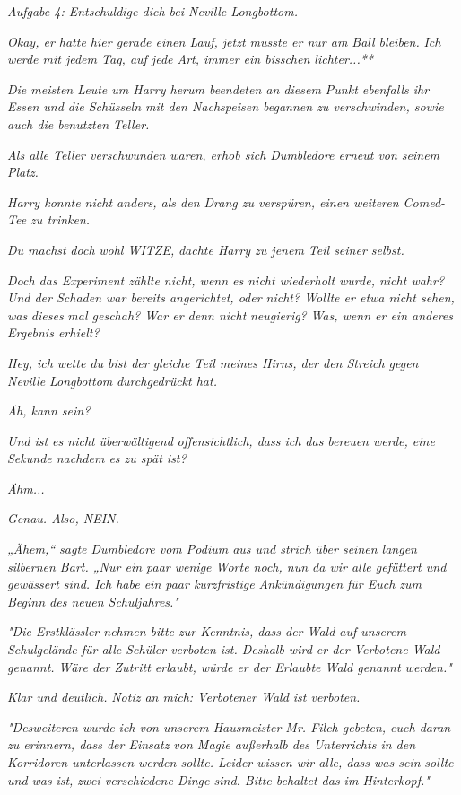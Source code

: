 {\emph{\emph{Aufgabe 4: Entschuldige dich bei Neville Longbottom.}}

\emph{Okay, er hatte hier gerade einen Lauf, jetzt musste er nur am Ball bleiben.} \emph{\emph{Ich werde mit jedem Tag, auf jede Art, immer ein bisschen lichter...}**}

\emph{Die meisten Leute um Harry herum beendeten an diesem Punkt ebenfalls ihr Essen und die Schüsseln mit den Nachspeisen begannen zu verschwinden, sowie auch die benutzten Teller.}

\emph{Als alle Teller verschwunden waren, erhob sich Dumbledore erneut von seinem Platz.}

\emph{Harry konnte nicht anders, als den Drang zu verspüren, einen weiteren Comed-Tee zu trinken.}

\emph{\emph{Du machst}} \emph{\emph{doch}} \emph{\emph{wohl WITZE,}} \emph{dachte Harry zu jenem Teil seiner selbst.}

\emph{Doch das Experiment zählte nicht, wenn es nicht wiederholt wurde, nicht wahr? Und der Schaden war bereits angerichtet, oder nicht? Wollte er etwa nicht sehen, was} \emph{\emph{dieses}} \emph{mal geschah? War er denn nicht} \emph{\emph{neugierig?}} \emph{Was, wenn er ein anderes Ergebnis erhielt?}

\emph{\emph{Hey, ich wette du bist der gleiche Teil meines Hirns, der den Streich gegen Neville}} \emph{\emph{Longbottom}} \emph{\emph{durchgedrückt hat.}}

\emph{Äh, kann sein?}

\emph{\emph{Und ist es nicht}} \emph{überwältigend} \emph{\emph{offensichtlich, dass ich das bereuen werde, eine Sekunde nachdem es zu spät ist?}}

\emph{Ähm...}

\emph{\emph{Genau. Also, NEIN.}}

\emph{„Ähem,“ sagte Dumbledore vom Podium aus und strich über seinen langen silbernen Bart. „Nur ein paar wenige Worte noch, nun da wir alle gefüttert und gewässert sind. Ich habe ein paar kurzfristige Ankündigungen für Euch zum Beginn des neuen Schuljahres."}

\emph{"Die Erstklässler nehmen bitte zur Kenntnis, dass der Wald auf unserem Schulgelände für alle Schüler verboten ist. Deshalb wird er der Verbotene Wald genannt. Wäre der Zutritt erlaubt, würde er der Erlaubte Wald genannt werden."}

\emph{Klar und deutlich.} \emph{\emph{Notiz an mich: Verbotener Wald ist verboten.}}

\emph{"Desweiteren wurde ich von unserem Hausmeister Mr. Filch gebeten, euch daran zu erinnern, dass der Einsatz von Magie außerhalb des Unterrichts in den Korridoren unterlassen werden sollte. Leider wissen wir alle, dass was sein} \emph{\emph{sollte}} \emph{und was} \emph{\emph{ist,}} \emph{zwei verschiedene Dinge sind. Bitte behaltet das im Hinterkopf."}

}
